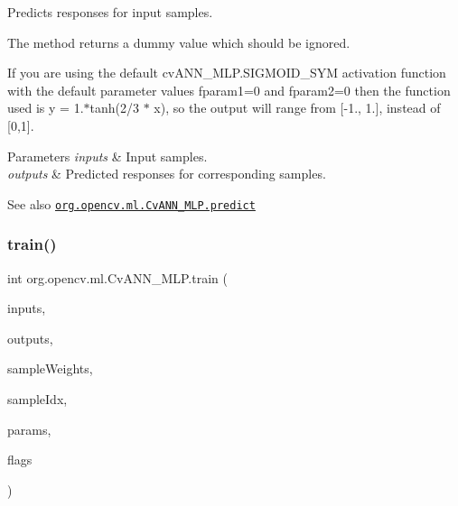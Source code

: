 Predicts responses for input samples.

The method returns a dummy value which should be ignored.

If you are using the default {\ttfamily cv\+A\+N\+N\+\_\+\+M\+L\+P.\+S\+I\+G\+M\+O\+I\+D\+\_\+\+S\+YM} activation function with the default parameter values fparam1=0 and fparam2=0 then the function used is y = 1.$\ast$tanh(2/3 $\ast$ x), so the output will range from \mbox{[}-\/1., 1.\mbox{]}, instead of \mbox{[}0,1\mbox{]}.


\begin{DoxyParams}{Parameters}
{\em inputs} & Input samples. \\
\hline
{\em outputs} & Predicted responses for corresponding samples.\\
\hline
\end{DoxyParams}
\begin{DoxySeeAlso}{See also}
\href{http://docs.opencv.org/modules/ml/doc/neural_networks.html#cvann-mlp-predict}{\tt org.\+opencv.\+ml.\+Cv\+A\+N\+N\+\_\+\+M\+L\+P.\+predict} 
\end{DoxySeeAlso}
\mbox{\label{classorg_1_1opencv_1_1ml_1_1_cv_a_n_n___m_l_p_a76ca0f8c604ca656557e9349ae92d4dc}} 
\subsubsection{\texorpdfstring{train()}{train()}\hspace{0.1cm}{\footnotesize\ttfamily [1/2]}}
{\footnotesize\ttfamily int org.\+opencv.\+ml.\+Cv\+A\+N\+N\+\_\+\+M\+L\+P.\+train (\begin{DoxyParamCaption}\item[{\mbox{\hyperlink{classorg_1_1opencv_1_1core_1_1_mat}{Mat}}}]{inputs,  }\item[{\mbox{\hyperlink{classorg_1_1opencv_1_1core_1_1_mat}{Mat}}}]{outputs,  }\item[{\mbox{\hyperlink{classorg_1_1opencv_1_1core_1_1_mat}{Mat}}}]{sample\+Weights,  }\item[{\mbox{\hyperlink{classorg_1_1opencv_1_1core_1_1_mat}{Mat}}}]{sample\+Idx,  }\item[{\mbox{\hyperlink{classorg_1_1opencv_1_1ml_1_1_cv_a_n_n___m_l_p___train_params}{Cv\+A\+N\+N\+\_\+\+M\+L\+P\+\_\+\+Train\+Params}}}]{params,  }\item[{int}]{flags }\end{DoxyParamCaption})}

